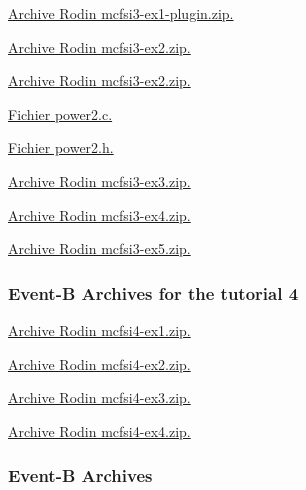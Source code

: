 \documentclass[ 12pt]{article}
\begin{document}
\href{http://mery54.github.io/teaching/mosos/models/mcfsi3-ex1-plugin.zip}{Archive 
  Rodin  mcfsi3-ex1-plugin.zip.}

\href{http://mery54.github.io/teaching/mosos/models/mcfsi3-ex2.zip}{Archive 
  Rodin  mcfsi3-ex2.zip.}

\href{http://mery54.github.io/teaching/mosos/models/mcfsi3-ex2-plugin.zip}{Archive 
  Rodin  mcfsi3-ex2.zip.}



\href{http://mery54.github.io/teaching/mosos/codes/power2.c}{Fichier 
  power2.c.}

\href{http://mery54.github.io/teaching/mosos/codes/power2.h}{Fichier 
  power2.h.}


\href{http://mery54.github.io/teaching/mosos/models/mcfsi3-ex3.zip}{Archive 
  Rodin  mcfsi3-ex3.zip.}



\href{http://mery54.github.io/teaching/mosos/models/mcfsi3-ex4.zip}{Archive 
  Rodin  mcfsi3-ex4.zip.}



\href{http://mery54.github.io/teaching/mosos/models/mcfsi3-ex5.zip}{Archive 
  Rodin  mcfsi3-ex5.zip.}



 \subsubsection{Event-B Archives for   the tutorial 4}
\label{sec:event-b-archives}





\href{http://mery54.github.io/teaching/mosos/models/mcfsi4-ex1.zip}{Archive 
  Rodin  mcfsi4-ex1.zip.}


\href{http://mery54.github.io/teaching/mosos/models/mcfsi4-ex2.zip}{Archive 
  Rodin  mcfsi4-ex2.zip.}





\href{http://mery54.github.io/teaching/mosos/models/mcfsi4-ex3.zip}{Archive 
  Rodin  mcfsi4-ex3.zip.}




\href{http://mery54.github.io/teaching/mosos/models/mcfsi4-ex4.zip}{Archive 
  Rodin  mcfsi4-ex4.zip.}





 \subsubsection{Event-B Archives}
\label{sec:event-b-archives}
\end{document}
